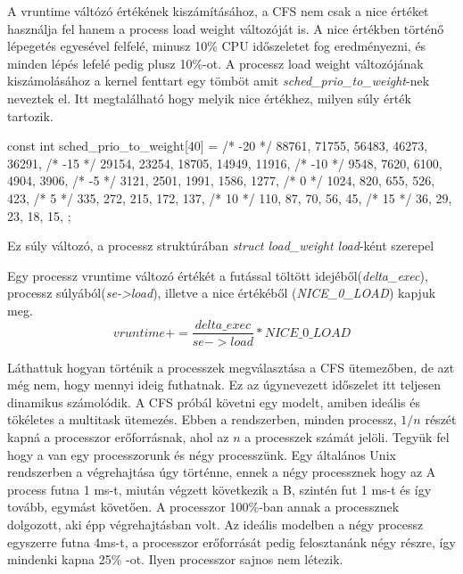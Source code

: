 A vruntime váltózó értékének kiszámításához, a CFS nem csak a nice értéket használja fel hanem a process load weight változóját is. A nice értékben történő lépegetés egyesével felfelé, minusz 10\% CPU időszeletet fog eredményezni, és minden lépés lefelé pedig plusz 10\%-ot. 
A processz load weight változójának kiszámolásához a kernel fenttart egy tömböt amit \textit{sched\_prio\_to\_weight}-nek neveztek el. Itt megtalálható hogy melyik nice értékhez, milyen súly érték tartozik.
\begin{cpp}
const int sched_prio_to_weight[40] = {
 /* -20 */     88761,     71755,     56483,     46273,     36291,
 /* -15 */     29154,     23254,     18705,     14949,     11916,
 /* -10 */      9548,      7620,      6100,      4904,      3906,
 /*  -5 */      3121,      2501,      1991,      1586,      1277,
 /*   0 */      1024,       820,       655,       526,       423,
 /*   5 */       335,       272,       215,       172,       137,
 /*  10 */       110,        87,        70,        56,        45,
 /*  15 */        36,        29,        23,        18,        15,
};
\end{cpp}


\noindent Ez súly változó, a processz struktúrában \textit{struct load\_weight load}-ként szerepel

Egy processz vruntime változó értékét a futással töltött idejéből(\textit{delta\_exec}), processz súlyából(\textit{se->load}), illetve a nice értékéből (\textit{NICE\_0\_LOAD}) kapjuk meg.
\begin{equation} \label{eq:2}
vruntime += \frac{delta\_exec}{se->load}*NICE\_0\_LOAD
\end{equation}

Láthattuk hogyan történik a processzek megválasztása a CFS ütemezőben, de azt még nem, hogy mennyi ideig futhatnak.
Ez az úgynevezett időszelet itt teljesen dinamikus számolódik.
A CFS próbál követni egy modelt, amiben ideális és tökéletes a multitask ütemezés. Ebben a rendszerben, minden processz, $1/n$ részét kapná a processzor erőforrásnak, ahol az $n$ a processzek számát jelöli. 
Tegyük fel hogy a van egy processzorunk és négy processzünk.
Egy általános Unix rendszerben a végrehajtása úgy történne, ennek a négy processznek hogy az A process futna 1 ms-t, miután végzett következik a B, szintén fut 1 ms-t és így tovább, egymást követően. A processzor 100\%-ban annak a processznek dolgozott, aki épp végrehajtásban volt.
Az ideális modelben a négy processz egyszerre futna 4ms-t, a processzor erőforrását pedig felosztanánk négy részre, így mindenki kapna 25\% -ot. Ilyen processzor sajnos nem létezik.

